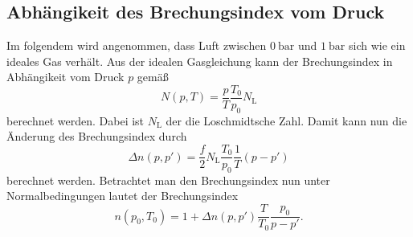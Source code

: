 \subsection{Abhängikeit des Brechungsindex vom Druck}
\label{subsec:Brechungsindex}
Im folgendem wird angenommen, dass Luft zwischen $\qty{0}{\bar}$ und $\qty{1}{\bar}$ sich wie ein ideales Gas verhält. Aus der idealen Gasgleichung kann der Brechungsindex in
Abhängikeit vom Druck $p$ gemäß 
\begin{equation*}
    N(p,T) = \frac{p}{T}\frac{T_0}{p_0}N_\text{L}
\end{equation*}
berechnet werden. Dabei ist $N_\text{L}$ der die Loschmidtsche Zahl. 
Damit kann nun die Änderung des Brechungsindex durch 
\begin{equation*}
    \Delta n(p,p') = \frac{f}{2}N_\text{L}\frac{T_0}{p_0}\frac{1}{T}(p - p')
\end{equation*}
berechnet werden.
Betrachtet man den Brechungsindex nun unter Normalbedingungen lautet der Brechungsindex 
\begin{equation}
    \label{eqn:Brechungsindex_Theorie}
    n(p_0, T_0) = 1 + \Delta n(p,p')\frac{T}{T_0}\frac{p_0}{p - p'}.
\end{equation}
